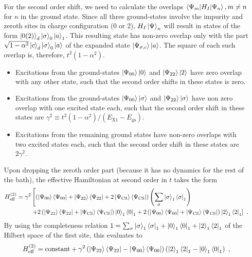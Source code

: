 \documentclass{iopart}
\begin{document}
For the second order shift, we need to calculate the overlaps \(\braket{\Psi_m | H_I | \Psi_n}, m\neq n\) for \(n\) in the ground state. Since all three ground-states involve the impurity and zeroth sites in charge configuration (0 or 2), \(H_I\ket{\Psi}_n\) will result in states of the form \(\ket{0(2)}_d\ket{\sigma}_0\ket{a}_1\). This resulting state has non-zero overlap only with the part \(\sqrt{1 - \alpha^2}\ket{c}_d\ket{\sigma}_0\ket{a}\) of the expanded state \(\ket{\Psi_{\sigma,c}}\ket{a}\). The square of each such overlap is, therefore, \(t^2\left( 1 - \alpha^2 \right) \). 
\begin{itemize}
	\item Excitations from the ground-states \(\ket{\Psi_{00}}\ket{0}\) and \(\ket{\Psi_{22}}\ket{2}\) have zero overlap with any other state, such that the second order shifts in these states is zero.
	\item Excitations from the ground-states \(\ket{\Psi_{00}}\ket{\sigma}\) and \(\ket{\Psi_{22}}\ket{\sigma}\) have non zero overlap with one excited state each, such that the second order shift in these states are \(\gamma^2 \equiv t^2\left( 1 - \alpha^2 \right) / \left(E_\text{X1} - E_\text{gs}\right) \).
	\item Excitations from the remaining ground states have non-zero overlaps with two excited states each, such that the second order shift in these states are \(2\gamma^2\).
\end{itemize}
Upon dropping the zeroth order part (because it has no dynamics for the rest of the bath), the effective Hamiltonian at second order in \(t\) takes the form
\begin{eqnarray}
	H_\text{eff}^{(2)} = \gamma^2 &\left[\left(\ket{\Psi_{00}}\bra{\Psi_{00}} + \ket{\Psi_{22}}\bra{\Psi_{22}} + 2\ket{\Psi_\text{CS}}\bra{\Psi_\text{CS}}\right)\left(\sum_\sigma \ket{\sigma}_1\bra{\sigma}_1\right) \right.\nonumber \\
				      &\left.  + 2\left(\ket{\Psi_{22}}\bra{\Psi_{22}} + \ket{\Psi_\text{CS}}\bra{\Psi_\text{CS}}\right) \ket{0}_1\bra{0}_1+2\left(\ket{\Psi_{00}}\bra{\Psi_{00}} + \ket{\Psi_\text{CS}}\bra{\Psi_\text{CS}}\right)\ket{2}_1\bra{2}_1\right]~.
\end{eqnarray}
By using the completeness relation \(1 = \sum_\sigma \ket{\sigma}_1\bra{\sigma}_1 + \ket{0}_1\bra{0}_1 + \ket{2}_1\bra{2}_1\) of the Hilbert space of the first site, this evaluates to
\begin{eqnarray}
	H_\text{eff}^{(2)} = \text{constant} + \gamma^2 \left(\ket{\Psi_{22}}\bra{\Psi_{22}} - \ket{\Psi_{00}}\bra{\Psi_{00}} \right) \left(\ket{2}_1\bra{2}_1 - \ket{0}_1\bra{0}_1\right) ~,
\end{eqnarray}
\end{document}
